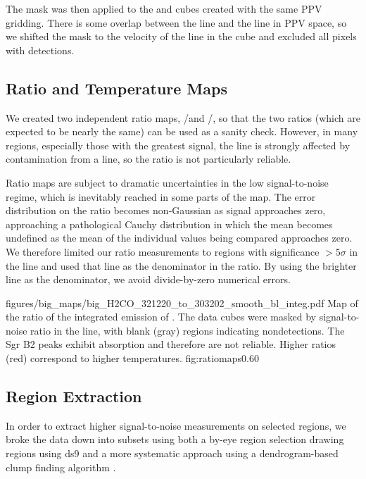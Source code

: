 The \para \threeohthree mask was then applied to the \threetwoone and
\threetwotwo cubes created with the same PPV gridding.  There is some overlap
between the \methanol \fourtwotwo line and the \para \threetwotwo line in PPV
space, so we shifted the \para mask to the velocity of the \methanol line in
the \para \threetwotwo cube and excluded all pixels with \para detections.

\subsection{Ratio and Temperature Maps}
\label{sec:h2co}
We created two independent ratio maps, \threetwotwo/\threeohthree and
\threetwoone/\threeohthree, so that the two ratios (which are expected to be
nearly the same) can be used as a sanity check.  However, in many regions,
especially those with the greatest signal, the \threetwotwo line is strongly
affected by contamination from a \methanol line, so the ratio is not
particularly reliable.

Ratio maps are subject to dramatic uncertainties in the low signal-to-noise
regime, which is inevitably reached in some parts of the map.  The error
distribution on the ratio becomes non-Gaussian as signal approaches zero,
approaching a pathological Cauchy distribution in which the mean becomes
undefined as the mean of the individual values being compared approaches zero.
We therefore limited our ratio measurements to regions with significance
$>5\sigma$ in the \threeohthree line and used that line as the denominator
in the ratio.  By using the brighter line as the denominator, we avoid
divide-by-zero numerical errors.


\Figure
{figures/big_maps/big_H2CO_321220_to_303202_smooth_bl_integ.pdf}
{Map of the ratio of the integrated emission of
\Rone.  The data cubes were masked by
signal-to-noise ratio in the \threeohthree line, with blank (gray) regions
indicating nondetections.  The Sgr B2 peaks exhibit \formaldehyde
absorption and therefore are not reliable.  Higher ratios (red) correspond
to higher temperatures.
}
{fig:ratiomaps}{0.6}{0}

\subsection{Region Extraction}
In order to extract higher signal-to-noise measurements on selected regions, we
broke the data down into subsets using both a by-eye region selection drawing
regions using ds9 and a more systematic approach using a dendrogram-based clump
finding algorithm \citep[][\url{http://dendrograms.org/}]{Rosolowsky2008c}.

